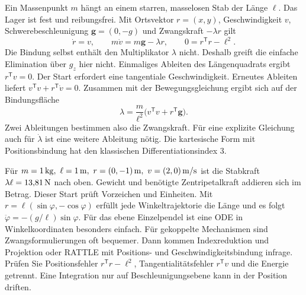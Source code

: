Ein Massenpunkt \(m\) hängt an einem starren, masselosen Stab der Länge \(\ell\). Das Lager ist fest und reibungsfrei. Mit Ortsvektor \(r=(x,y)\), Geschwindigkeit \(v\), Schwerebeschleunigung \(\mathbf g=(0,-g)\) und Zwangskraft \(-\lambda r\) gilt
\[
 \dot r=v,\qquad m\dot v=m\mathbf g-\lambda r,\qquad
 0=r^\mathsf T r-\ell^2.
\]
Die Bindung selbst enthält den Multiplikator \(\lambda\) nicht. Deshalb greift die einfache Elimination über \(g_z\) hier nicht.
Einmaliges Ableiten des Längenquadrats ergibt \(r^\mathsf T v=0\). Der Start erfordert eine tangentiale Geschwindigkeit. Erneutes Ableiten liefert \(v^\mathsf T v+r^\mathsf T\dot v=0\). Zusammen mit der Bewegungsgleichung ergibt sich auf der Bindungsfläche
\[
 \lambda=\frac{m}{\ell^2}\big(v^\mathsf Tv+r^\mathsf T\mathbf g\big).
\]
Zwei Ableitungen bestimmen also die Zwangskraft. Für eine explizite Gleichung auch für \(\dot\lambda\) ist eine weitere Ableitung nötig. Die kartesische Form mit Positionsbindung hat den klassischen Differentiationsindex 3.

Für \(m=1\unitm{kg},\ \ell=1\unitm m,\ r=(0,-1)\unitm m,\ v=(2,0)\unitm{m/s}\) ist die Stabkraft \(\lambda\ell=13{,}81\,\mathrm{N}\) nach oben. Gewicht und benötigte Zentripetalkraft addieren sich im Betrag. Dieser Start prüft Vorzeichen und Einheiten.
Mit \(r=\ell(\sin\varphi,-\cos\varphi)\) erfüllt jede Winkeltrajektorie die Länge und es folgt \(\ddot\varphi=-(g/\ell)\sin\varphi\). Für das ebene Einzelpendel ist eine ODE in Winkelkoordinaten besonders einfach. Für gekoppelte Mechanismen sind Zwangsformulierungen oft bequemer. Dann kommen Indexreduktion und Projektion oder RATTLE mit Positions- und Geschwindigkeitsbindung infrage. Prüfen Sie Positionsfehler \(r^\mathsf T r-\ell^2\), Tangentialitätsfehler \(r^\mathsf T v\) und die Energie getrennt. Eine Integration nur auf Beschleunigungsebene kann in der Position driften.

